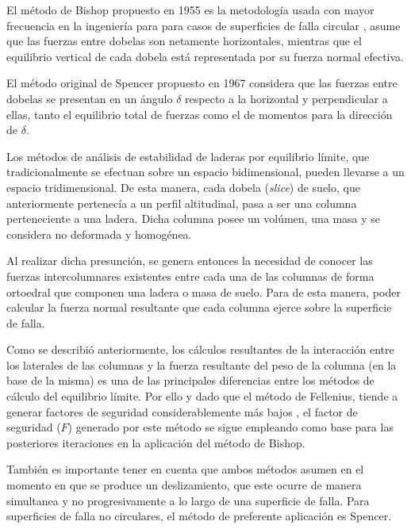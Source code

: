 El m\'etodo de Bishop propuesto en 1955 es la metodolog\'ia usada con mayor frecuencia en la ingenier\'ia para para casos de superficies de falla circular \cite{huangB}, asume que las fuerzas entre dobelas son netamente horizontales, mientras que el equilibrio vertical de cada dobela est\'a representada por su fuerza normal efectiva.

El m\'etodo original de Spencer propuesto en 1967 \cite{spencer1967method} considera que las fuerzas entre dobelas se presentan en un \'angulo $\delta$ respecto a la horizontal y perpendicular a ellas, tanto el equilibrio total de fuerzas como el de momentos para la direcci\'on de $\delta$. 

Los m\'etodos de an\'alisis de estabilidad de laderas por equilibrio l\'imite, que tradicionalmente se efectuan sobre un espacio bidimensional, pueden llevarse a un espacio tridimensional. 
De esta manera, cada dobela (\textit{slice}) de suelo, que anteriormente pertenec\'ia a un perfil altitudinal, pasa a ser una columna perteneciente a una ladera. Dicha columna posee un vol\'umen, una masa y se considera no deformada y homog\'enea. \cite{huang2000new}

Al realizar dicha presunci\'on, se genera entonces la necesidad de conocer las fuerzas intercolumnares existentes entre cada una de las columnas de forma ortoedral que componen una ladera o masa de suelo. Para de esta manera, poder calcular la fuerza normal resultante que cada columna ejerce sobre la superficie de falla.\cite{reid2015scoops3d}

Como se describi\'o anteriormente, los c\'alculos resultantes de la interacci\'on entre los laterales de las columnas y la fuerza resultante del peso de la columna (en la base de la misma) es una de las principales diferencias entre los m\'etodos de c\'alculo del equilibrio l\'imite. Por ello y dado que el m\'etodo de Fellenius, tiende a generar factores de seguridad considerablemente m\'as bajos \cite{traditional}, el factor de seguridad (\(F\)) generado por este m\'etodo se sigue empleando como base para las posteriores iteraciones en la aplicaci\'on del m\'etodo de Bishop. \cite{fredlund1977comparison}

Tambi\'en es importante tener en cuenta que ambos m\'etodos asumen en el momento en que se produce un deslizamiento, que este ocurre de manera simultanea y no progresivamente a lo largo de una superficie de falla.
Para superficies de falla no circulares, el m\'etodo de preferente aplicaci\'on es Spencer.  \cite{huangS} 



